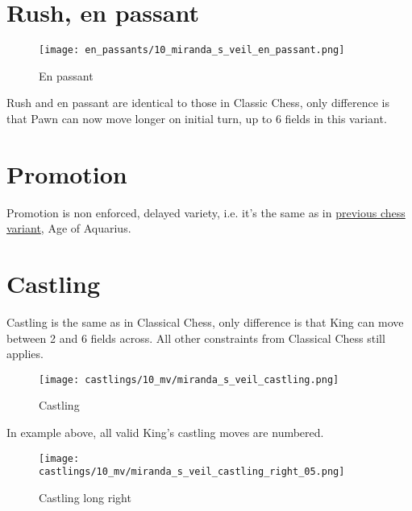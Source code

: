 \section*{Rush, en passant}

\noindent
\begin{wrapfigure}[5]{l}{0.4\textwidth}
\centering
\texttt{[image: en\_passants/10\_miranda\_s\_veil\_en\_passant.png]}
\caption{En passant}
\label{fig:10_miranda_s_veil_en_passant}
\end{wrapfigure}
Rush and en passant are identical to those in Classic Chess, only difference
is that Pawn can now move longer on initial turn, up to 6 fields in this
variant.


\vspace*{9.0\baselineskip}
\section*{Promotion}

Promotion is non enforced, delayed variety, i.e. it's the same as in
\hyperref[sec:Age of Aquarius/Promotion]{previous chess variant}, Age of Aquarius.

\clearpage %

\section*{Castling}

Castling is the same as in Classical Chess, only difference is that King can move between 2 and 6 fields across.
All other constraints from Classical Chess still applies.

\noindent
\begin{figure}[!h]
\texttt{[image: castlings/10\_mv/miranda\_s\_veil\_castling.png]}
\caption{Castling}
\label{fig:miranda_s_veil_castling}
\end{figure}

In example above, all valid King's castling moves are numbered.

\noindent
\begin{figure}[!h]
\texttt{[image: castlings/10\_mv/miranda\_s\_veil\_castling\_right\_05.png]}
\caption{Castling long right}
\label{fig:miranda_s_veil_castling_right_05}
\end{figure}

